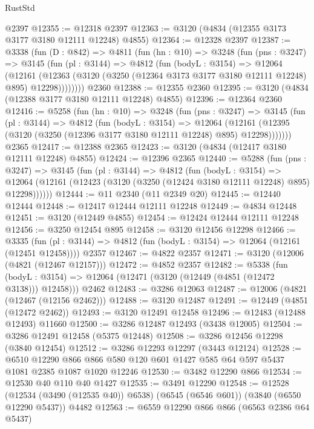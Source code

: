 \begin{lexlean}{RustStd}
\begin{coremodule}
    @2397
@12355 := @12318 @2397
@12363 := @3120 (@4834 (@12355 @3173 @3177 @3180 @12111 @12248) @4855)
@12364 := @12328 @2397
@12387 := @3338
    (fun (D : @842) =>
    @4811
      (fun (hn : @10) =>
      @3248
        (fun (pns : @3247) =>
        @3145
          (fun (pl : @3144) =>
          @4812
            (fun (bodyL : @3154) =>
            @12064
              (@12161
                (@12363 (@3120 (@3250 (@12364 @3173 @3177 @3180 @12111 @12248) @895) @12298))))))))
    @2360
@12388 := @12355 @2360
@12395 := @3120 (@4834 (@12388 @3177 @3180 @12111 @12248) @4855)
@12396 := @12364 @2360
@12416 := @5258
    (fun (hn : @10) =>
    @3248
      (fun (pns : @3247) =>
      @3145
        (fun (pl : @3144) =>
        @4812
          (fun (bodyL : @3154) =>
          @12064
            (@12161 (@12395 (@3120 (@3250 (@12396 @3177 @3180 @12111 @12248) @895) @12298)))))))
    @2365
@12417 := @12388 @2365
@12423 := @3120 (@4834 (@12417 @3180 @12111 @12248) @4855)
@12424 := @12396 @2365
@12440 := @5288
    (fun (pns : @3247) =>
    @3145
      (fun (pl : @3144) =>
      @4812
        (fun (bodyL : @3154) =>
        @12064 (@12161 (@12423 (@3120 (@3250 (@12424 @3180 @12111 @12248) @895) @12298))))))
@12444 := @11 @2340 (@11 @2349 @20)
@12445 := @12440 @12444
@12448 := @12417 @12444 @12111 @12248
@12449 := @4834 @12448
@12451 := @3120 (@12449 @4855)
@12454 := @12424 @12444 @12111 @12248
@12456 := @3250 @12454 @895
@12458 := @3120 @12456 @12298
@12466 := @3335
    (fun (pl : @3144) => @4812 (fun (bodyL : @3154) => @12064 (@12161 (@12451 @12458))))
    @2357
@12467 := @4822 @2357
@12471 := @3120 (@12006 (@4821 (@12467 @12157)))
@12472 := @4852 @2357
@12482 := @5338
    (fun (bodyL : @3154) => @12064 (@12471 (@3120 (@12449 (@4851 (@12472 @3138))) @12458)))
    @2462
@12483 := @3286 @12063
@12487 := @12006 (@4821 (@12467 (@12156 @2462)))
@12488 := @3120 @12487
@12491 := @12449 (@4851 (@12472 @2462))
@12493 := @3120 @12491 @12458
@12496 := @12483 (@12488 @12493) @11660
@12500 := @3286 @12487 @12493 (@3438 @12005)
@12504 := @3286 @12491 @12458 (@5375 @12448)
@12508 := @3286 @12456 @12298 (@3840 @12454)
@12512 := @3286 @12293 @12297 (@3443 @12124)
@12528 := @6510
    @12290
    @866
    @866
    @580
    @120
    @601
    @1427
    @585
    @64
    @597
    @5437
    @1081
    @2385
    @1087
    @1020
    @12246
@12530 := @3482 @12290 @866
@12534 := @12530 @40 @110 @40 @1427
@12535 := @3491 @12290
@12548 := @12528
    (@12534 (@3490 (@12535 @40)) @6538)
    (@6545 (@6546 @601))
    (@3840 (@6550 @12290 @5437))
    @4482
@12563 := @6559
    @12290
    @866
    @866
    (@6563 @2386 @64 @5437)

\end{coremodule}
\end{lexlean}
